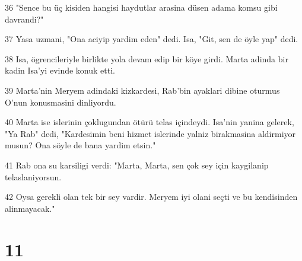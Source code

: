 \par 36 "Sence bu üç kisiden hangisi haydutlar arasina düsen adama komsu gibi davrandi?"
\par 37 Yasa uzmani, "Ona aciyip yardim eden" dedi. Isa, "Git, sen de öyle yap" dedi.
\par 38 Isa, ögrencileriyle birlikte yola devam edip bir köye girdi. Marta adinda bir kadin Isa'yi evinde konuk etti.
\par 39 Marta'nin Meryem adindaki kizkardesi, Rab'bin ayaklari dibine oturmus O'nun konusmasini dinliyordu.
\par 40 Marta ise islerinin çoklugundan ötürü telas içindeydi. Isa'nin yanina gelerek, "Ya Rab" dedi, "Kardesimin beni hizmet islerinde yalniz birakmasina aldirmiyor musun? Ona söyle de bana yardim etsin."
\par 41 Rab ona su karsiligi verdi: "Marta, Marta, sen çok sey için kaygilanip telaslaniyorsun.
\par 42 Oysa gerekli olan tek bir sey vardir. Meryem iyi olani seçti ve bu kendisinden alinmayacak."

\chapter{11}

